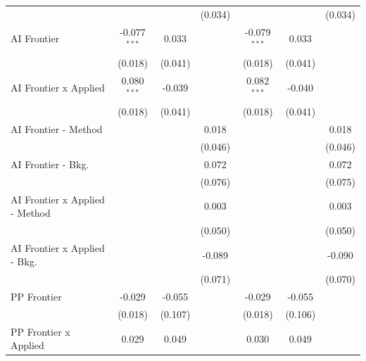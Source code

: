 \begin{tabular}{lcccccc}
                                  &                &                & (0.034)        &                &                & (0.034)\\   
   AI Frontier                    & -0.077$^{***}$ & 0.033          &                & -0.079$^{***}$ & 0.033          &   \\   
                                  & (0.018)        & (0.041)        &                & (0.018)        & (0.041)        &   \\   
   AI Frontier x Applied          & 0.080$^{***}$  & -0.039         &                & 0.082$^{***}$  & -0.040         &   \\   
                                  & (0.018)        & (0.041)        &                & (0.018)        & (0.041)        &   \\   
   AI Frontier - Method           &                &                & 0.018          &                &                & 0.018\\   
                                  &                &                & (0.046)        &                &                & (0.046)\\   
   AI Frontier - Bkg.             &                &                & 0.072          &                &                & 0.072\\   
                                  &                &                & (0.076)        &                &                & (0.075)\\   
   AI Frontier x Applied - Method &                &                & 0.003          &                &                & 0.003\\   
                                  &                &                & (0.050)        &                &                & (0.050)\\   
   AI Frontier x Applied - Bkg.   &                &                & -0.089         &                &                & -0.090\\   
                                  &                &                & (0.071)        &                &                & (0.070)\\   
   PP Frontier                    & -0.029         & -0.055         &                & -0.029         & -0.055         &   \\   
                                  & (0.018)        & (0.107)        &                & (0.018)        & (0.106)        &   \\   
   PP Frontier x Applied          & 0.029          & 0.049          &                & 0.030          & 0.049          &   \\   

\end{tabular}
